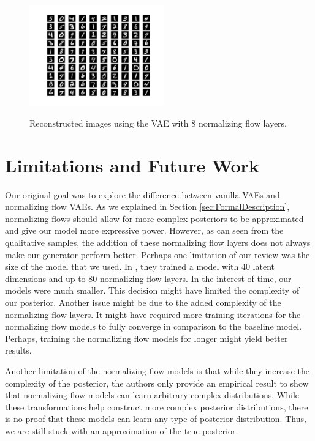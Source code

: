 \documentclass{article}
\begin{document}
\begin{figure}[htbp]
\begin{center}
	\includegraphics[width=0.52\textwidth]{reconstruction_8Layers.png}
\label{fig:NormFlow8}
\caption{Reconstructed images using the VAE with 8 normalizing flow layers.}
\label{fig:NormFlow8}
\end{center}
\end{figure}

\section{Limitations and Future Work}
Our original goal was to explore the difference between vanilla VAEs and normalizing flow VAEs. As we
explained in Section \ref{sec:FormalDescription}, normalizing flows should allow for more complex posteriors 
to be approximated and give our model more expressive power. However, as can seen from the qualitative 
samples, the addition of these normalizing flow layers does not always make our generator perform better. 
Perhaps one limitation of our review was the size of the model that we used. In \citet{RM15}, they trained a 
model with 40 latent dimensions and up to 80 normalizing flow layers. In the interest of time, our models were 
much smaller. This decision might have limited the complexity of our posterior. Another issue might be 
due to the added complexity of the normalizing flow layers. It might have required more training iterations 
for the normalizing flow models to fully converge in comparison to the baseline model. Perhaps, training 
the normalizing flow models for longer might yield better results.

Another limitation of the normalizing flow models is that while they increase the complexity of the posterior, 
the authors only provide an empirical result to show that normalizing flow models can learn arbitrary 
complex distributions. While these transformations help construct more complex posterior distributions, 
there is no proof that these models can learn any type of posterior distribution. Thus, we are still stuck 
with an approximation of the true posterior.
\end{document}
